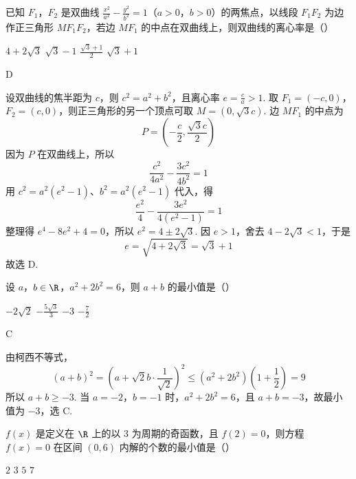 \begin{problem}
已知 \(F_{1}\)，\(F_{2}\) 是双曲线 \(\frac{x^{2}}{a^{2}} - \frac{y^{2}}{b^{2}} = 1\)（\(a > 0\)，\(b > 0\)）的两焦点，以线段 \(F_{1}F_{2}\) 为边作正三角形 \(MF_{1}F_{2}\)，若边 \(MF_{1}\) 的中点在双曲线上，则双曲线的离心率是（\quad）

\choices
    {\(4 + 2\sqrt{3}\)}
    {\(\sqrt{3} - 1\)}
    {\(\frac{\sqrt{3} + 1}{2}\)}
    {\(\sqrt{3} + 1\)}
\end{problem}

\begin{answer}
D
\end{answer}

\begin{solution}
设双曲线的焦半距为 \(c\)，则 \(c^2=a^2+b^2\)，且离心率 \(e=\frac{c}{a}>1\). 取 \(F_1=(-c,0)\)，\(F_2=(c,0)\)，则正三角形的另一个顶点可取 \(M=(0,\sqrt{3}c)\). 边 \(MF_1\) 的中点为
\[
P=\left(-\frac{c}{2},\frac{\sqrt{3}c}{2}\right)
\]
因为 \(P\) 在双曲线上，所以
\[
\frac{c^2}{4a^2}-\frac{3c^2}{4b^2}=1
\]
用 \(c^2=a^2(e^2-1)\)、\(b^2=a^2(e^2-1)\) 代入，得
\[
\frac{e^2}{4}-\frac{3e^2}{4(e^2-1)}=1
\]
整理得 \(e^4-8e^2+4=0\)，所以 \(e^2=4\pm2\sqrt{3}\).
因 \(e>1\)，舍去 \(4-2\sqrt{3}<1\)，于是
\[
e=\sqrt{4+2\sqrt{3}}=\sqrt{3}+1
\]
故选 D.
\end{solution}



\begin{problem}
设 \(a\)，\(b \in \R\)，\(a^2 + 2b^2 = 6\)，则 \(a + b\) 的最小值是（\quad）

\choices
    {\(-2\sqrt{2}\)}
    {\(-\frac{5\sqrt{3}}{3}\)}
    {\(-3\)}
    {\(-\frac{7}{2}\)}
\end{problem}

\begin{answer}
C
\end{answer}

\begin{solution}
由柯西不等式，
\[
(a+b)^2=\left(a+\sqrt{2}b\cdot\frac{1}{\sqrt{2}}\right)^2
\leqslant\left(a^2+2b^2\right)\left(1+\frac{1}{2}\right)=9
\]
所以 \(a+b\geqslant-3\). 当 \(a=-2\)，\(b=-1\) 时，\(a^2+2b^2=6\)，且 \(a+b=-3\)，故最小值为 \(-3\)，选 C.
\end{solution}



\begin{problem}
\(f(x)\) 是定义在 \(\R\) 上的以 \(3\) 为周期的奇函数，且 \(f(2) = 0\)，则方程 \(f(x) = 0\) 在区间 \((0,6)\) 内解的个数的最小值是（\quad）

\choices
    {\(2\)}
    {\(3\)}
    {\(5\)}
    {\(7\)}
\end{problem}


